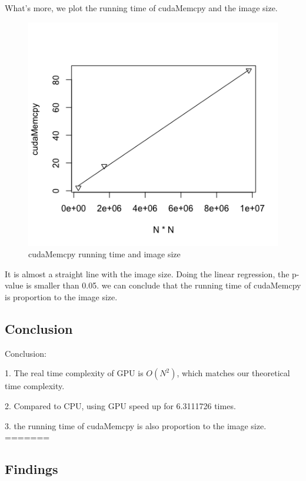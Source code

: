 \documentclass[12pt, a4paper]{article}
\begin{document}
What's more, we plot the running time of cudaMemcpy and the image size.

  \begin{figure}[! htbp]
    \includegraphics[scale=0.5]{image/Rplot.png}
\caption{cudaMemcpy running time and image size}
\end{figure}

It is almost a straight line with the image size. Doing the linear regression, the p-value is smaller than 0.05. we can conclude that the running time of cudaMemcpy is proportion to the image size.


  \subsection{Conclusion}
Conclusion: 

1. The real time complexity of GPU is  $O(N^2)$, which matches our theoretical time complexity.

2. Compared to CPU, using GPU speed up for 6.3111726 times.

3. the running time of cudaMemcpy is also proportion to the image size.
=======
  \subsection{Findings}
\end{document}
